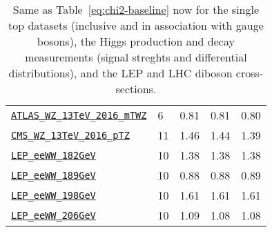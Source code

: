 \begin{table}[htbp]
\begin{tabular}{l|C{1.1cm}|C{2.1cm}|C{2.5cm}|C{2.5cm}}
 \href{https://arxiv.org/abs/1902.05759}{\tt ATLAS\_WZ\_13TeV\_2016\_mTWZ} & 6 &  0.81   &  0.81  & 0.80     \\
 \href{https://arxiv.org/abs/1901.03428}{\tt CMS\_WZ\_13TeV\_2016\_pTZ} & 11 &  1.46   &  1.44    &  1.39    \\
 \href{https://arxiv.org/abs/1302.3415}{\tt LEP\_eeWW\_182GeV} & 10 &  1.38  &  1.38   & 1.38     \\
 \href{https://arxiv.org/abs/1302.3415}{\tt LEP\_eeWW\_189GeV} & 10 & 0.88    & 0.88   &  0.89    \\
 \href{https://arxiv.org/abs/1302.3415}{\tt LEP\_eeWW\_198GeV} & 10 &  1.61   &  1.61    &  1.61    \\
 \href{https://arxiv.org/abs/1302.3415}{\tt LEP\_eeWW\_206GeV} & 10 &  1.09   &  1.08   &  1.08    \\
\bottomrule
\end{tabular}
  \caption{\small Same as Table~\ref{eq:chi2-baseline} now for the single top
    datasets (inclusive and in association with gauge bosons), the Higgs production and decay measurements (signal streghts and differential
    distributions), and the LEP and LHC
    diboson cross-sections.
\label{eq:chi2-baseline2}
}
\end{table}

